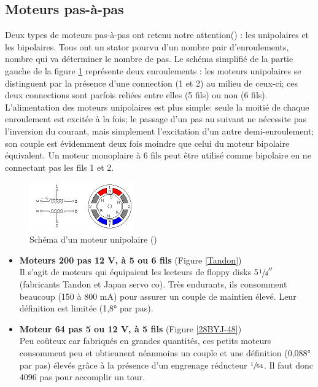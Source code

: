\documentclass[a4paper,10pt]{report}
\begin{document}
\subsection{Moteurs pas-à-pas}
Deux types de moteurs pas-à-pas ont retenu notre attention(\cite{stepper}) : les unipolaires et les bipolaires. Tous ont un stator pourvu d'un nombre pair d'enroulements, nombre qui va déterminer le nombre de pas. Le schéma simplifié de la partie gauche de la figure \ref{unipolar} représente deux enroulements : les moteurs unipolaires se distinguent par la présence d'une connection (1 et 2) au milieu de ceux-ci; ces deux connections sont parfois reliées entre elles (5 fils) ou non (6 fils). L'alimentation des moteurs unipolaires est plus simple: seule la moitié de chaque enroulement est excitée à la fois; le passage d'un pas au suivant ne nécessite pas l'inversion du courant, mais simplement l'excitation d'un autre demi-enroulement; son couple est évidemment deux fois moindre que celui du moteur bipolaire équivalent. Un moteur monoplaire à 6 fils peut être utilisé comme bipolaire en ne connectant pas les fils 1 et 2.
\begin{figure}[h!]
\centering
\includegraphics[width=0.4\textwidth]{2anim.png}
\caption{Schéma d'un moteur unipolaire (\cite{jones_stepper})}
\label{unipolar}
\end{figure}
\begin{itemize}
\item \textbf{Moteurs 200 pas 12 V, à 5 ou 6 fils} (Figure \ref{Tandon}) \\
Il s'agit de moteurs qui équipaient les lecteurs de floppy disks 5$\sfrac{1}{4}''$ (fabricants Tandon et Japan servo co). Très endurants, ils consomment beaucoup (150 à 800 mA) pour assurer un couple de maintien élevé. Leur définition est limitée (1,8° par pas).
\item \textbf{Moteur 64 pas 5 ou 12 V, à 5 fils} (Figure \ref{28BYJ-48}) \\
Peu coûteux car fabriqués en grandes quantités, ces petits moteurs consomment peu et obtiennent néanmoins un couple et une définition (0,088° par pas) élevés grâce à la présence d'un engrenage réducteur $\sfrac{1}{64}$. Il faut donc 4096 pas pour accomplir un tour.
\end{itemize}
\end{document}
